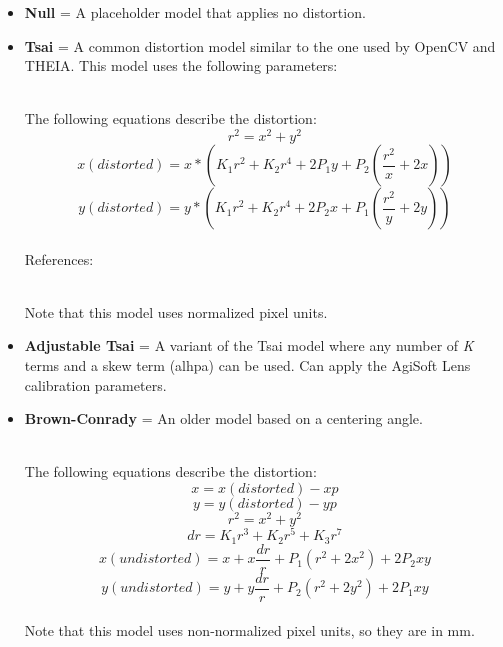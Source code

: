\begin{itemize}{}
\item  \textbf{Null} = A placeholder model that applies no distortion.

\item  \textbf{Tsai} = A common distortion model similar to the one used by OpenCV and THEIA.
 This model uses the following parameters:
\hfill \\ The following equations describe the distortion:
\[ r^{2} = x^{2} + y^{2} \]
\[ x(distorted) = x*(K_{1}r^{2} + K_{2}r^{4} + 2P_{1}y + P_{2}(\frac{r^{2}}{x} + 2x)) \]
\[ y(distorted) = y*(K_{1}r^{2} + K_{2}r^{4} + 2P_{2}x + P_{1}(\frac{r^{2}}{y} + 2y))  \]
\hfill \\ References:
\hfill \\ Note that this model uses normalized pixel units.

\item  \textbf{Adjustable Tsai} = A variant of the Tsai model where any number of \textit{K} terms and a skew term (alhpa) can be used.  Can apply the AgiSoft Lens calibration parameters.

\item  \textbf{Brown-Conrady} = An older model based on a centering angle.
\hfill \\ The following equations describe the distortion:
\[ x = x(distorted) - xp \]
\[ y = y(distorted) - yp \]
\[ r^{2} = x^{2} + y^{2} \]
\[ dr = K_{1}r^{3} + K_{2}r^{5} + K_{3}r^{7} \]
\[ x(undistorted) = x + x\frac{dr}{r} + P_{1}(r^{2} +2x^{2}) + 2P_{2}xy \]
\[ y(undistorted) = y + y\frac{dr}{r} + P_{2}(r^{2} +2y^{2}) + 2P_{1}xy \]
\hfill \\ Note that this model uses non-normalized pixel units, so they
are in mm.


\end{itemize}
